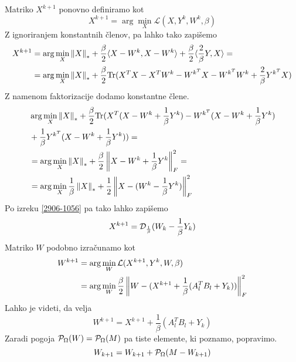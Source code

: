 Matriko $X^{k+1}$ ponovno definiramo kot
\[
    X^{k+1} = \arg \min_X \mathcal{L}(X, Y^k, W^k, \beta)
\]
Z ignoriranjem konstantnih členov, pa lahko tako zapišemo 
\begin{align*}
    X^{k+1} & = \arg \min_X \left\lVert X\right\rVert_* + \frac{\beta}{2}\langle X-W^k, X-W^k \rangle + \frac{\beta}{2}\langle \frac{2}{\beta}Y, X \rangle =     \\
            & = \arg \min_X \left\lVert X\right\rVert_* + \frac{\beta}{2}\text{Tr}(X^TX - X^TW^k - W^{k^T}X - W^{k^T}W^k + \frac{2}{\beta}Y^{k^T}X )
\end{align*}
Z namenom faktorizacije dodamo konstantne člene.
\begin{align*}
     & \arg \min_X \left\lVert X\right\rVert_* + \frac{\beta}{2}\text{Tr}(X^T(X - W^k + \frac{1}{\beta}Y^k) - W^{k^T} (X - W^k + \frac{1}{\beta}Y^k) \\
     & +\frac{1}{\beta}Y^{k^T}(X - W^k + \frac{1}{\beta}Y^k)) =                                                            \\
     & = \arg \min_X \left\lVert X\right\rVert_* + \frac{\beta}{2} \left\lVert X-W^k + \frac{1}{\beta}Y^k\right\rVert_F^2 =                                        \\
     & = \arg \min_X \frac{1}{\beta}\left\lVert X\right\rVert_* +  \frac{1}{2}\left\lVert X-(W^k - \frac{1}{\beta}Y^k)\right\rVert_F^2
\end{align*}
Po izreku \eqref{2906-1056} pa tako lahko zapišemo
\[
    X^{k+1} = \mathcal{D}_\frac{1}{\beta}(W_k - \frac{1}{\beta} Y_k)
\]
Matriko $W$ podobno izračunamo kot
\begin{align*}
    W^{k+1} & = \arg \min_{W} \mathcal{L}(X^{k+1}, Y^k, W, \beta)                                     \\
            & = \arg \min_W \frac{\beta}{2} \left\lVert W - (X^{k+1} + \frac{1}{\beta}(A_l^T B_l + Y_k)) \right\rVert_F^2
\end{align*}
Lahko je videti, da velja
\[
    W^{k+1} = X^{k+1} + \frac{1}{\beta}(A_l^T B_l + Y_k)
\]
Zaradi pogoja $\mathcal{P}_\Omega(W) = \mathcal{P}_\Omega(M)$ pa tiste elemente, ki poznamo, popravimo. \cite{TNNM-HZYLH12}
\begin{equation}
    \label{2906-1248}
    W_{k+1} = W_{k+1} + \mathcal{P}_\Omega(M - W_{k+1})
\end{equation}
